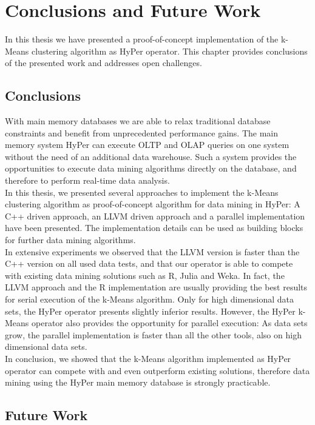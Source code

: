 \chapter{Conclusions and Future Work}\label{chapter:conclusion}
In this thesis we have presented a proof-of-concept implementation of the k-Means clustering algorithm as HyPer operator. This chapter provides conclusions of the presented work and addresses open challenges.

\section{Conclusions}
With main memory databases we are able to relax traditional database constraints and benefit from unprecedented performance gains. The main memory system HyPer can execute OLTP and OLAP queries on one system without the need of an additional data warehouse. Such a system provides the opportunities to execute data mining algorithms directly on the database, and therefore to perform real-time data analysis. 
\\
In this thesis, we presented several approaches to implement the k-Means clustering algorithm as proof-of-concept algorithm for data mining in HyPer: A C++ driven approach, an LLVM driven approach and a parallel implementation have been presented. The implementation details can be used as building blocks for further data mining algorithms.
\\
In extensive experiments we observed that the LLVM version is faster than the C++ version on all used data tests, and that our operator is able to compete with existing data mining solutions such as R, Julia and Weka. In fact, the LLVM approach and the R implementation are usually providing the best results for serial execution of the k-Means algorithm. Only for high dimensional data sets, the HyPer operator presents slightly inferior results. However, the HyPer k-Means operator also provides the opportunity for parallel execution: As data sets grow, the parallel implementation is faster than all the other tools, also on high dimensional data sets.
\\
In conclusion, we showed that the k-Means algorithm implemented as HyPer operator can compete with and even outperform existing solutions, therefore data mining using the HyPer main memory database is strongly practicable.

\section{Future Work}

